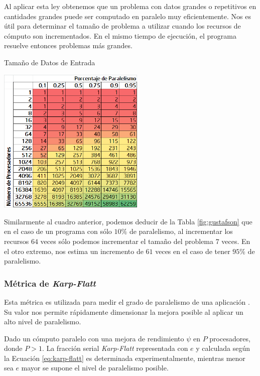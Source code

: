 \documentclass[a4paper]{report}
\begin{document}
\bigskip

Al aplicar esta ley obtenemos que un problema con datos grandes o repetitivos en cantidades grandes puede ser computado en paralelo muy eficientemente. Nos es útil para determinar el tamaño de problema a utilizar cuando los recursos de cómputo son incrementados. En el mismo tiempo de ejecución, el programa resuelve entonces problemas más grandes.

\begin{table}[H]
\caption{Tamaño de Datos de Entrada}
\centering
\includegraphics[width=7cm]{gustafson.png}
\label{fig:gustafson}
\end{table}

Similarmente al cuadro anterior, podemos deducir de la Tabla \ref{fig:gustafson} que en el caso de un programa con sólo $ 10\% $ de paralelismo, al incrementar los recursos $ 64 $ veces sólo podemos incrementar el tamaño del problema $ 7 $ veces. En el otro extremo, nos estima un incremento de $ 61 $ veces en el caso de tener $ 95\% $ de paralelismo.

\subsubsection{Métrica de {\it Karp-Flatt}}

Esta métrica es utilizada para medir el grado de paralelismo de una aplicación \cite{karp-flatt}. Su valor nos permite rápidamente dimensionar la mejora posible al aplicar un alto nivel de paralelismo.

\bigskip

Dado un cómputo paralelo con una mejora de rendimiento $ \psi $ en $ P $
procesadores, donde $ P > 1 $. La fracción serial {\it Karp-Flatt} representada con $ e $ y calculada según la Ecuación \ref{eq:karp-flatt} es determinada experimentalmente, mientras menor sea $ e $ mayor se supone el nivel de paralelismo posible.
\end{document}
